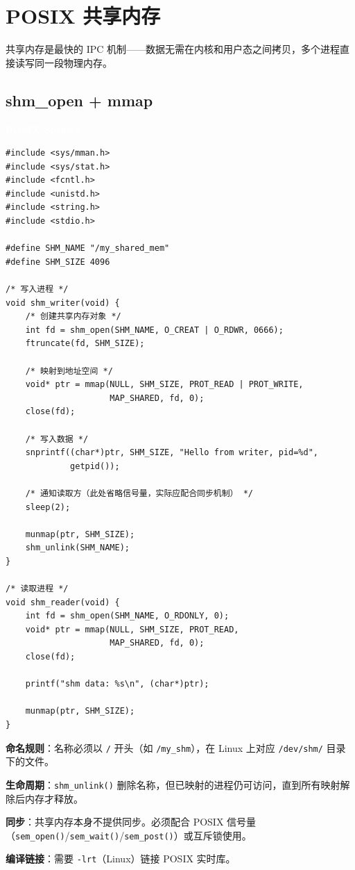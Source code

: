 \documentclass[12pt,a4paper,fontset=fandol]{ctexbook}
\newcommand{\Fn}[1]{\texttt{#1()}}
\newcommand{\Tp}[1]{\texttt{#1}}
\newcommand{\posixlabel}{%
  \noindent\begin{tcolorbox}[sharp corners,colback=posixheadbg,colframe=posixheadbg,
    left=6pt,right=6pt,top=2pt,bottom=2pt,boxrule=0pt]
  \textcolor{white}{\small\bfseries\sffamily POSIX Sockets}\end{tcolorbox}%
}
\begin{document}
\section{POSIX 共享内存}

共享内存是最快的 IPC 机制——数据无需在内核和用户态之间拷贝，多个进程直接读写同一段物理内存。

\subsection{shm\_open + mmap}

\posixlabel
\begin{lstlisting}[style=cstyle]
#include <sys/mman.h>
#include <sys/stat.h>
#include <fcntl.h>
#include <unistd.h>
#include <string.h>
#include <stdio.h>

#define SHM_NAME "/my_shared_mem"
#define SHM_SIZE 4096

/* 写入进程 */
void shm_writer(void) {
    /* 创建共享内存对象 */
    int fd = shm_open(SHM_NAME, O_CREAT | O_RDWR, 0666);
    ftruncate(fd, SHM_SIZE);

    /* 映射到地址空间 */
    void* ptr = mmap(NULL, SHM_SIZE, PROT_READ | PROT_WRITE,
                     MAP_SHARED, fd, 0);
    close(fd);

    /* 写入数据 */
    snprintf((char*)ptr, SHM_SIZE, "Hello from writer, pid=%d",
             getpid());

    /* 通知读取方（此处省略信号量，实际应配合同步机制） */
    sleep(2);

    munmap(ptr, SHM_SIZE);
    shm_unlink(SHM_NAME);
}

/* 读取进程 */
void shm_reader(void) {
    int fd = shm_open(SHM_NAME, O_RDONLY, 0);
    void* ptr = mmap(NULL, SHM_SIZE, PROT_READ,
                     MAP_SHARED, fd, 0);
    close(fd);

    printf("shm data: %s\n", (char*)ptr);

    munmap(ptr, SHM_SIZE);
}
\end{lstlisting}

\begin{guideline}[title=POSIX 共享内存要点]
\textbf{命名规则}：名称必须以 \texttt{/} 开头（如 \texttt{/my\_shm}），在 Linux 上对应 \texttt{/dev/shm/} 目录下的文件。

\textbf{生命周期}：\Tp{shm\_unlink()} 删除名称，但已映射的进程仍可访问，直到所有映射解除后内存才释放。

\textbf{同步}：共享内存本身不提供同步。必须配合 POSIX 信号量（\Fn{sem\_open}/\allowbreak{}\Fn{sem\_wait}/\allowbreak{}\Fn{sem\_post}）或互斥锁使用。

\textbf{编译链接}：需要 \texttt{-lrt}（Linux）链接 POSIX 实时库。
\end{guideline}
\end{document}
